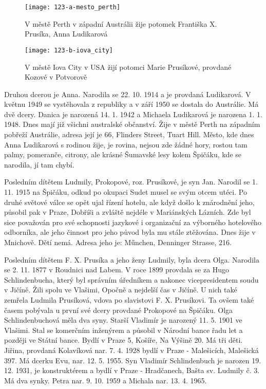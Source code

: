 \documentclass[../dejiny-rodu-prusiku.tex]{subfiles}
\begin{document}
\begin{figure}
\centering
\texttt{[image: 123-a-mesto\_perth]}
\caption{V městě Perth v západní Austrálii žije potomek Františka X. Prusíka, Anna Ludikarová}
\label{fig:123-a-mesto_perth}
\end{figure}

\begin{figure}
\centering
\texttt{[image: 123-b-iova\_city]}
\caption{V městě Iova City v USA žijí potomci Marie Prusíkové, provdané Kozové v Potvorově}
\label{fig:123-b-iova_city}
\end{figure}

Druhou dcerou je Anna. Narodila se 22. 10. 1914 a je provdaná Ludikarová. V květnu 1949 se vystěhovala z republiky a v září 1950 se dostala do Austrálie. Má dvě dcery. Danica je narozená 14. 1. 1942 a Michaela Ludika­rová je narozena 1. 1. 1948. Dnes mají již všichni australské občanství. Žije v městě Perth na západním pobřeží Austrálie, adresa její je 66, Flinders Street, Tuart Hill. Město, kde dnes Anna Ludikarová s rodinou žije, je rovina, nejsou zde žádné hory, rostou tam palmy, pomeranče, citrony, ale krásné Šumavské lesy kolem Špičáku, kde se narodila, jí tam chybí.

Posledním dítětem Ludmily, Prokopové, roz. Prusíkové, je syn Jan. Narodil se 1. 11. 1915 na Špičáku, odkud po okupaci Sudet musel se svým otcem utéci. Po druhé světové válce se opět ujal řízení hotelu, ale když došlo k znárodnění jeho, působil pak v Praze, Dobříši a zvláště nejdéle v Mariánských Lázních. Zde byl sice považován pro své schopnosti jazykové i organizační za výborného hotelového odborníka, ale jeho činnost pro jeho původ byla mu stále ztěžována. Dnes žije v Mnichově. Dětí nemá. Adresa jeho je: Műnchen, Denninger Strasse, 216.

Posledním dítětem F. X. Prusíka a jeho ženy Ludmily, byla dcera Olga. Narodila se 2. 11. 1877 v Roudnici nad Labem. V roce 1899 provdala se za Hugo Schlindenbucha, který byl správním úředníkem a nakonec vicepresidentem soudu v Jičíně. Žili spolu ve Vlašimi, Opočně a nejdelší čas v Jičíně. U nich také zemřela Ludmila Prusíková, vdova po slavistovi F. X. Prusíkovi. Ta ovšem také časem pobývala u první své dcery provdané Prokopové na Špičáku. Olga Schlindenbuchová měla dva syny. Starší Vladimír je narozený 11. 5. 1901 ve Vlašimi. Stal se komerčním inže­nýrem a působil v Národní bance řadu let a později ve Státní bance. Bydlí v Praze 5, Košíře, Na Výšině 20. Má tři děti. Jiřina, provdaná Kolavíková nar. 7. 4. 1928 bydlí v Praze - Malešicích, Malešická 397. Má dcerku Evu, nar. 12. 5. 1955. Syn Vladimír Schlindenbuch je narozen 19. 12. 1931, je konstruktérem a bydlí v Praze - Hradčanech, Bašta sv. Ludmily č. 3. Má dva synky. Petra nar. 9. 10. 1959 a Michala nar. 13. 4. 1965.
\end{document}
